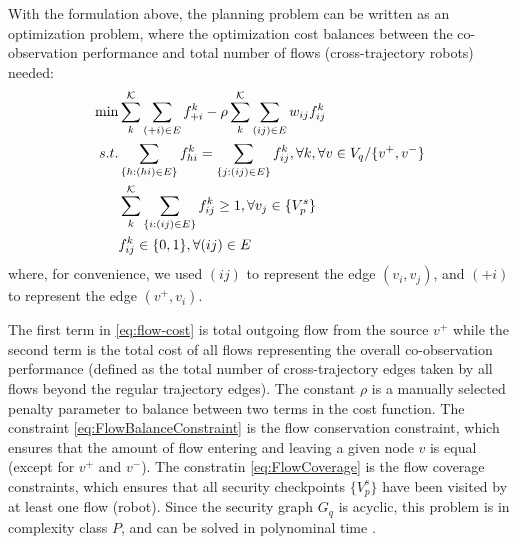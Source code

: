\documentclass[journal]{IEEEtran}  %
\begin{document}
With the formulation above, the planning problem can be written as an optimization problem, where the optimization cost balances between the co-observation performance and total number of flows (cross-trajectory robots) needed:
 \begin{subequations} \label{eq:flow-coverage-problem}
     \begin{align}
        \min & \sum^{\mathcal{K}}_{k} \sum_{(+i)\in E} f^{k}_{+i} - \rho \sum^{\mathcal{K}}_k \sum_{(ij)\in E} w_{ij} f^k_{ij} \label{eq:flow-cost}\\
        s.t. & \sum_{\{h:(hi) \in E\}}f^k_{hi}=\sum_{\{j:(ij) \in E\}}f^k_{ij},  \forall k,\forall v \in V_{q} / \{v^{+}, v^{-}\}  \label{eq:FlowBalanceConstraint}\\
        & \sum^{\mathcal{K}}_k\sum_{\{i:(ij)\in E \}} f^k_{ij} \geq 1, \forall v_{j} \in \{V^{s}_{p}\} \label{eq:FlowCoverage}\\
        & f^k_{ij} \in \{0,1\} ,  \forall (ij)\in E\label{eq:SingleFLowCapacity}
     \end{align}
 \end{subequations}
where, for convenience, we used $(ij)$ to represent the edge $(v_{i},v_{j})$, and $(+i)$ to represent the edge $(v^{+},v_{i})$.

The first term in \ref{eq:flow-cost} is total outgoing flow from the source $v^{+}$ while the second term is the total cost of all flows representing the overall co-observation performance (defined as the total number of cross-trajectory edges taken by all flows beyond the regular trajectory edges). The constant $\rho$ is a manually selected penalty parameter to balance between two terms in the cost function. The constraint \eqref{eq:FlowBalanceConstraint} is the flow conservation constraint, which ensures that the amount of flow entering and leaving a given node $v$ is equal (except for $v^{+}$ and $v^{-}$). The constratin \eqref{eq:FlowCoverage} is the flow coverage constraints, which ensures that all security checkpoints $ \{V^{s}_{p}\}$ have been visited by at least one flow (robot). Since the security graph $G_{q}$ is acyclic, this problem is in complexity class $P$, and can be solved in polynominal time \cite{ntafos1979path}. 
\end{document}
